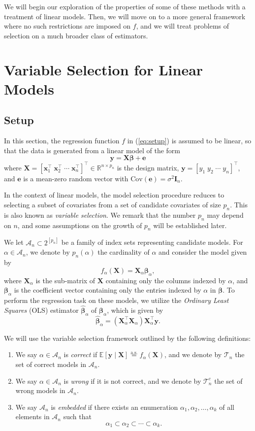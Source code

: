 \documentclass[11pt, letter paper]{article}
\newcommand{\1}{\mathmybb{1}}
\newcommand{\R}{\mathbb{R}}
\newcommand{\0}{\emptyset}
\newcommand{\Ep}[1]{\mathbb{E}\left[ #1 \right]}
\newcommand{\paren}[1]{\left(#1 \right)}
\newcommand{\sqbr}[1]{\left[#1 \right]}
\newcommand{\Acal}{\mathcal{A}_{n}}
\newcommand{\Tcal}{\mathcal{T}_{n}}
\newcommand{\aseq}{\stackrel{\mathrm{a.s.}}{=}}
\newcommand{\X}{\boldsymbol{X}}
\newcommand{\x}{\boldsymbol{x}}
\newcommand{\y}{\boldsymbol{y}}
\newcommand{\e}{\boldsymbol{e}}
\newcommand{\Cov}[1]{\mathrm{Cov}\paren{#1}}
\newcommand{\bbeta}{\boldsymbol{\beta}}
\newcommand{\bbetahat}{\boldsymbol{\hat{\beta}}}
\newcommand{\ols}[1]{\paren{\X^{\top}_{#1}\X_{#1}}\X^{\top}_{#1}\y}
\begin{document}
We will begin our exploration of the properties of some of these methods with a treatment of linear models. Then, we will move on to a more general framework where no such restrictions are imposed on \(f\), and we will treat problems of selection on a much broader class of estimators.

\section{Variable Selection for Linear Models}\label{sec:lm}
\subsection{Setup}\label{sec:lmsetup}
In this section, the regression function \(f\) in (\ref{eq:setup}) is assumed to be linear, so that the data is generated from a linear model of the form
\[\y = \X\bbeta + \e\]
where \(\X = {[\x_{1}^{\top}\;\x_{2}^{\top}\;\cdots\;\x_{n}^{\top}]}^{\top}\in\R^{n\times p_{n}}\) is the design matrix, \(\y = \sqbr{y_{1}\; y_{2}\;\cdots\; y_{n}}^{\top}\), and \(\e\) is a mean-zero random vector with \(\Cov{\e} = \sigma^{2}\boldsymbol{I}_{n}\).

In the context of linear models, the model selection procedure reduces to selecting a subset of covariates from a set of candidate covariates of size \(p_n\). This is also known as \emph{variable selection}. We remark that the number \(p_n\) may depend on \(n\), and some assumptions on the growth of \(p_n\) will be established later.

We let \(\Acal\subset2^{[p_{n}]}\) be a family of index sets representing candidate models. For \(\alpha\in\Acal\), we denote by \(p_{n}(\alpha)\) the cardinality of \(\alpha\) and consider the model given by
\[f_{\alpha}(\X) = \X_{\alpha}\bbeta_{\alpha},\]
where \(\X_{\alpha}\) is the sub-matrix of \(\X\) containing only the columns indexed by \(\alpha\), and \(\bbeta_{\alpha}\) is the coefficient vector containing only the entries indexed by \(\alpha\) in \(\bbeta\). To perform the regression task on these models, we utilize the \emph{Ordinary Least Squares} (OLS) estimator \(\bbetahat_{\alpha}\) of \(\bbeta_{\alpha}\), which is given by
\[\bbetahat_{\alpha} = \ols{\alpha}.\]

We will use the variable selection framework outlined by the following definitions:

\begin{enumerate}
    \item We say \(\alpha\in\Acal\) is \emph{correct} if \(\Ep{\y\mid\X}\aseq f_{\alpha}(\X)\), and we denote by \(\Tcal\) the set of correct models in \(\Acal\).
    \item We say \(\alpha\in\Acal\) is \emph{wrong} if it is not correct, and we denote by \(\Tcal^{c}\) the set of wrong models in \(\Acal\).
    \item We say \(\Acal\) is \emph{embedded} if there exists an enumeration \(\alpha_{1}, \alpha_{2}, \ldots, \alpha_{k}\) of all elements in \(\Acal\) such that \[\alpha_{1}\subset\alpha_{2}\subset\cdots\subset\alpha_{k}.\]
\end{enumerate}
\end{document}

